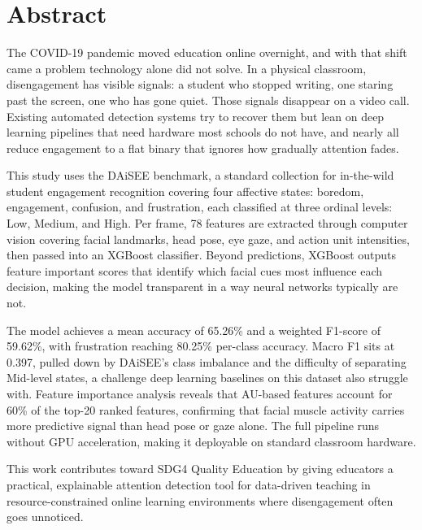 
\chapter*{Abstract}
\thispagestyle{plain}

The COVID-19 pandemic moved education online overnight, and with that shift came a problem technology alone did not solve. In a physical classroom, disengagement has visible signals: a student who stopped writing, one staring past the screen, one who has gone quiet. Those signals disappear on a video call. Existing automated detection systems try to recover them but lean on deep learning pipelines that need hardware most schools do not have, and nearly all reduce engagement to a flat binary that ignores how gradually attention fades.

This study uses the DAiSEE benchmark, a standard collection for in-the-wild student engagement recognition covering four affective states: boredom, engagement, confusion, and frustration, each classified at three ordinal levels: Low, Medium, and High. Per frame, 78 features are extracted through computer vision covering facial landmarks, head pose, eye gaze, and action unit intensities, then passed into an XGBoost classifier. Beyond predictions, XGBoost outputs feature important scores that identify which facial cues most influence each decision, making the model transparent in a way neural networks typically are not.

The model achieves a mean accuracy of 65.26\% and a weighted F1-score of 59.62\%, with frustration reaching 80.25\% per-class accuracy. Macro F1 sits at 0.397, pulled down by DAiSEE's class imbalance and the difficulty of separating Mid-level states, a challenge deep learning baselines on this dataset also struggle with. Feature importance analysis reveals that AU-based features account for 60\% of the top-20 ranked features, confirming that facial muscle activity carries more predictive signal than head pose or gaze alone. The full pipeline runs without GPU acceleration, making it deployable on standard classroom hardware.

This work contributes toward SDG4 Quality Education by giving educators a practical, explainable attention detection tool for data-driven teaching in resource-constrained online learning environments where disengagement often goes unnoticed.

